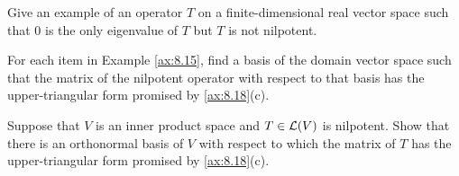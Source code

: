 \begin{exc}
\begin{exercise}
Give an example of an operator $T$ on a finite-dimensional real vector space
such that $0$ is the only eigenvalue of $T$ but $T$ is not nilpotent.
\end{exercise}

\begin{exercise}
For each item in Example \ref{ax:8.15}, find a basis of the domain vector space
such that the matrix of the nilpotent operator with respect to that basis has
the upper-triangular form promised by \ref{ax:8.18}(c).
\end{exercise}

\begin{exercise}
Suppose that $V$ is an inner product space and $T\in\mathcal{L}(V)$ is nilpotent.
Show that there is an orthonormal basis of $V$ with respect to which the matrix
of $T$ has the upper-triangular form promised by \ref{ax:8.18}(c).
\end{exercise}
\end{exc}
